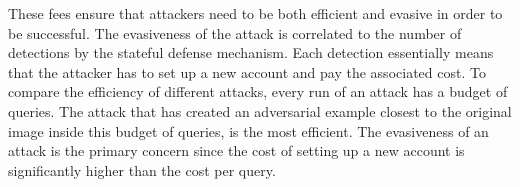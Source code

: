 These fees ensure that attackers need to be both efficient and evasive in order to be successful. The evasiveness of the attack is correlated to the number of detections by the stateful defense mechanism. Each detection essentially means that the attacker has to set up a new account and pay the associated cost. To compare the efficiency of different attacks, every run of an attack has a budget of queries. The attack that has created an adversarial example closest to the original image inside this budget of queries, is the most efficient. The evasiveness of an attack is the primary concern since the cost of setting up a new account is significantly higher than the cost per query.


